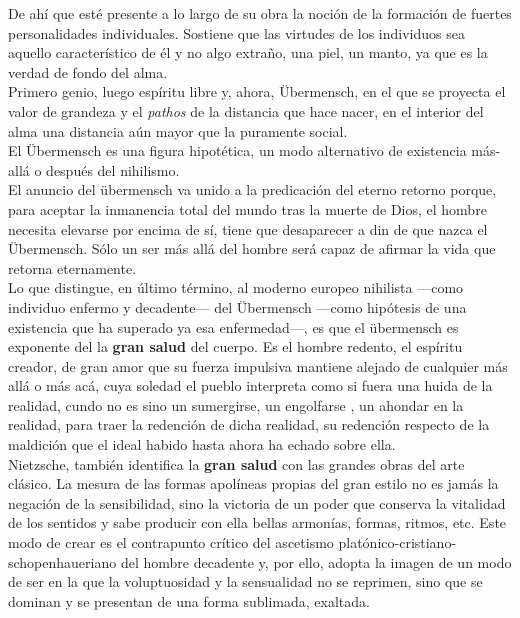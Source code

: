 \documentclass[a4paper, 10pt, twocolumn, spanish]{article}
\begin{document}
De ahí que esté presente a lo largo de su obra la noción de la
formación de fuertes personalidades individuales. Sostiene que las
virtudes de los individuos sea aquello característico de él y no algo
extraño, una piel, un manto, ya que es la verdad de fondo del alma.\\[0pt]

Primero genio, luego espíritu libre y, ahora, Übermensch, en el que se
proyecta el valor de grandeza y el \emph{pathos} de la distancia que hace
nacer, en el interior del alma una distancia aún mayor que la
puramente social.\\[0pt]
El Übermensch es una figura hipotética, un modo alternativo de
existencia más-allá o después del nihilismo.\\[0pt]
El anuncio del übermensch va unido a la predicación del eterno retorno
porque, para aceptar la inmanencia total del mundo tras la muerte de
Dios, el hombre necesita elevarse por encima de sí, tiene que
desaparecer a din de que nazca el Übermensch. Sólo un ser más allá del
hombre será capaz de afirmar la vida que retorna eternamente.\\[0pt]

Lo que distingue, en último término, al moderno europeo nihilista
—como individuo enfermo y decadente— del Übermensch —como hipótesis de
una existencia que ha superado ya esa enfermedad—, es que el
übermensch es exponente del la \textbf{gran salud} del cuerpo. Es el hombre
redento, el espíritu creador, de gran amor que su fuerza impulsiva
mantiene alejado de cualquier más allá o más acá, cuya soledad el
pueblo interpreta como si fuera una huida de la realidad, cundo no es
sino un sumergirse, un engolfarse , un ahondar en la realidad, para
traer la redención de dicha realidad, su redención respecto de la
maldición que el ideal habido hasta ahora ha echado sobre ella.\\[0pt]


Nietzsche, también identifica la \textbf{gran salud} con las grandes obras
del arte clásico. La mesura de las formas apolíneas propias del gran
estilo no es jamás la negación de la sensibilidad, sino la victoria de
un poder que conserva la vitalidad de los sentidos y sabe producir con
ella bellas armonías, formas, ritmos, etc. Este modo de crear es el
contrapunto crítico del ascetismo platónico-cristiano-schopenhaueriano
del hombre decadente y, por ello, adopta la imagen de un modo de ser
en la que la voluptuosidad y la sensualidad no se reprimen, sino que
se dominan y se presentan de una forma sublimada, exaltada.\\[0pt]
\end{document}
